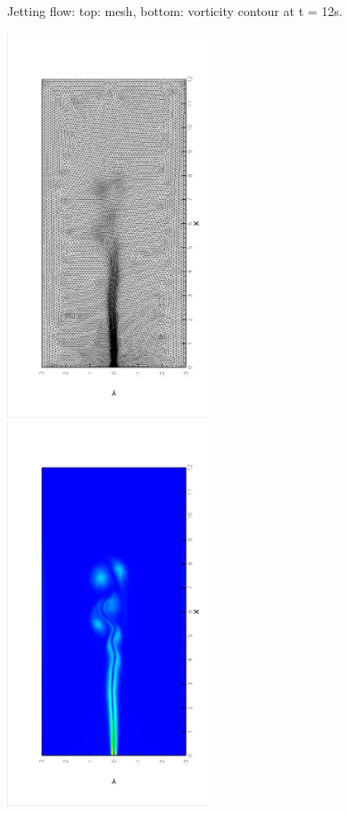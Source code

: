 \begin{figure}[!htbp]
\begin{center}
        \end{center}
        \caption{\small Jetting flow: top: mesh, bottom: vorticity contour at t = 12s.}
        \label{fig::jetting_flow_mesht12s}
       \end{figure}

       \begin{figure}[!htbp]
         \begin{center}
             \includegraphics[width = 0.53\textwidth, angle = -90]{picture/first/jet_flow_data/mesh_t27s.eps}
             \includegraphics[width = 0.53\textwidth, angle = -90]{picture/first/jet_flow_data/contour_t27s.eps}

\end{center}
\end{figure}

